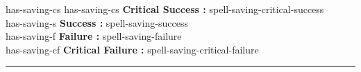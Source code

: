 \documentclass{article}
\begin{document}
\begin{spell}
\begin{singlespace*}
        has-saving-cs \vspace{2mm}
        has-saving-cs \textbf{Critical Success :} spell-saving-critical-success\\
        has-saving-s \textbf{Success :} spell-saving-success\\
        has-saving-f \textbf{Failure :} spell-saving-failure\\
        has-saving-cf \textbf{Critical Failure :} spell-saving-critical-failure\\
        \rule{\textwidth}{0.5pt}
        \end{singlespace*}
    \endgroup
\end{spell}
\end{document}
